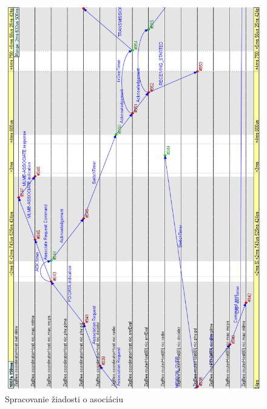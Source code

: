 \begin{figure}[htbp]
\begin{center}
\includegraphics[width=140mm]{figures/chart_associate_request}
\caption{Spracovanie žiadosti o asociáciu}
\label{fig:chart_associate_request}
\end{center}
\end{figure}

